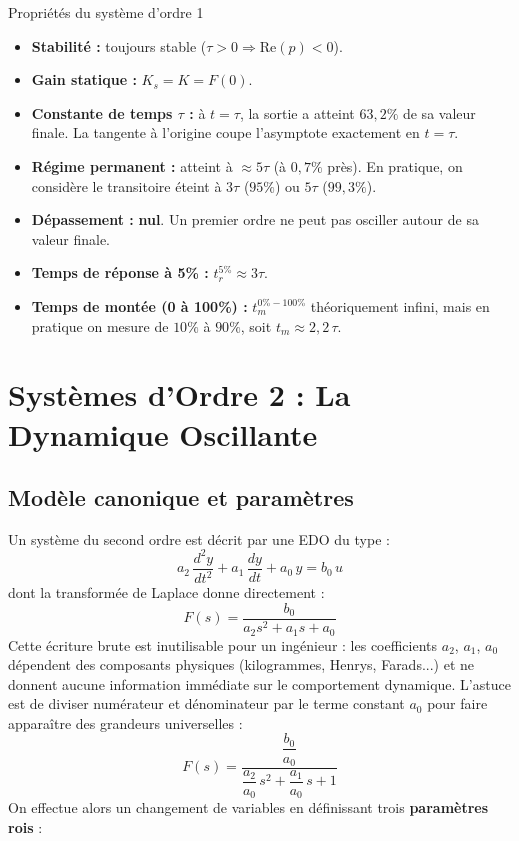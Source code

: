 \documentclass[11pt,a4paper]{report}
\begin{document}
\begin{importantbox}{Propriétés du système d'ordre 1}
  \begin{itemize}
    \item \textbf{Stabilité :} toujours stable ($\tau > 0 \Rightarrow \text{Re}(p) < 0$).
    \item \textbf{Gain statique :} $K_s = K = F(0)$.
    \item \textbf{Constante de temps $\tau$ :} à $t = \tau$, la sortie a atteint $63{,}2\%$ de sa valeur finale. La tangente à l'origine coupe l'asymptote exactement en $t = \tau$.
    \item \textbf{Régime permanent :} atteint à $\approx 5\tau$ (à $0{,}7\%$ près). En pratique, on considère le transitoire éteint à $3\tau$ ($95\%$) ou $5\tau$ ($99{,}3\%$).
    \item \textbf{Dépassement :} \textbf{nul}. Un premier ordre ne peut pas osciller autour de sa valeur finale.
    \item \textbf{Temps de réponse à 5\% :} $t_r^{5\%} \approx 3\tau$.
    \item \textbf{Temps de montée (0 à 100\%) :} $t_m^{0\%-100\%}$ théoriquement infini, mais en pratique on mesure de $10\%$ à $90\%$, soit $t_m \approx 2{,}2\,\tau$.
  \end{itemize}
\end{importantbox}

\section{Systèmes d'Ordre 2 : La Dynamique Oscillante}

\subsection{Modèle canonique et paramètres}

Un système du second ordre est décrit par une EDO du type :
\[
  a_2\,\frac{d^2y}{dt^2} + a_1\,\frac{dy}{dt} + a_0\,y = b_0\,u
\]
dont la transformée de Laplace donne directement :
\[
  F(s) = \frac{b_0}{a_2 s^2 + a_1 s + a_0}
\]
Cette écriture brute est inutilisable pour un ingénieur : les coefficients $a_2$, $a_1$, $a_0$ dépendent des composants physiques (kilogrammes, Henrys, Farads...) et ne donnent aucune information immédiate sur le comportement dynamique. L'astuce est de diviser numérateur et dénominateur par le terme constant $a_0$ pour faire apparaître des grandeurs universelles :
\[
  F(s) = \frac{\dfrac{b_0}{a_0}}{\dfrac{a_2}{a_0}\,s^2 + \dfrac{a_1}{a_0}\,s + 1}
\]
On effectue alors un changement de variables en définissant trois \textbf{paramètres rois} :
\end{document}
